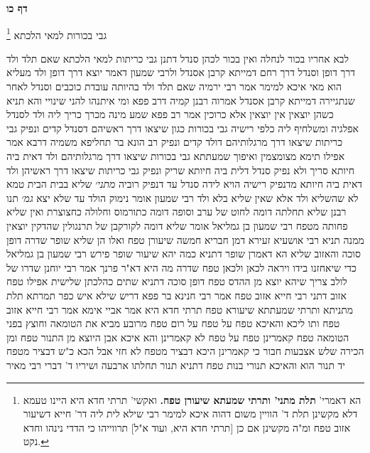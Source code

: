 \documentclass[12pt, openany]{book}
\newcommand{\sethebfont}{
\fontsize{10.5pt}{21.0pt} \selectfont
}
\newcommand{\twocol}[1]{
	{\sethebfont \begin{multicols}{2}
			#1
	\end{multicols}}	
}
\newcommand{\sectname}{}
\newcommand{\newsection}[1]{
	\addcontentsline{toc}{section}{#1}
	\renewcommand{\sectname}{#1}	
	\vspace{-\baselineskip}
	\begin{center}
		\textbf{%
\fontsize{16pt}{16pt}\selectfont
			#1}
	\end{center}
	\vspace{-\baselineskip}
	\nopagebreak
}
\newcommand{\footnotecomment}[1]{\footnote{#1}}
\newcommand{\commenta}[1]{\footnotecomment{#1}}
\begin{document}
\newsection{דף כו}
\twocol{גבי בכורות למאי הלכתא 
\commenta{ הא דאמרי' \textbf{תלת מתני' ותרתי שמעתא שיעורן טפח.}  ואקשי' תרתי חדא היא היינו טעמא דלא מקשינן תלת ד' הוויין משום דהוה איכא למימר רבי שילא לית ליה דר' חייא דשיעור אזוב טפח ומ"ה מקשינן אם כן [תרתי חדא היא, ועוד א"ל] תרווייהו כי הדדי נינהו וחדא נקט. }

לבא אחריו בכור לנחלה ואין בכור לכהן 
סנדל דתנן גבי כריתות למאי הלכתא 
שאם תלד ולד דרך דופן וסנדל דרך רחם דמייתא קרבן אסנדל 
ולרבי שמעון דאמר יוצא דרך דופן ולד מעליא הוא מאי איכא למימר 
אמר רבי ירמיה  שאם תלד ולד בהיותה עובדת כוכבים וסנדל לאחר שנתגיירה דמייתא קרבן אסנדל 
אמרוה רבנן קמיה דרב פפא  ומי איתנהו להני שינויי  והא תניא  כשהן יוצאין אין יוצאין אלא כרוכין 
אמר רב פפא  שמע מינה מכרך כריך ליה ולד לסנדל אפלגיה ומשלחיף ליה כלפי רישיה גבי בכורות כגון שיצאו דרך ראשיהם דסנדל קדים ונפיק  גבי כריתות שיצאו דרך מרגלותיהם דולד קדים ונפיק 
רב הונא בר תחליפא משמיה דרבא אמר  אפילו תימא מצומצמין ואיפוך שמעתתא גבי בכורות שיצאו דרך מרגלותיהם ולד דאית ביה חיותא סריך ולא נפיק סנדל דלית ביה חיותא שריק ונפיק  גבי כריתות שיצאו דרך ראשיהן ולד דאית ביה חיותא מדנפיק רישיה הויא לידה סנדל עד דנפיק רוביה
{\large\emph{מתני׳}} שליא בבית הבית טמא לא שהשליא ולד אלא שאין שליא בלא ולד 
רבי שמעון אומר  נימוק הולד עד שלא יצא
{\large\emph{גמ׳}} תנו רבנן שליא תחלתה דומה לחוט של ערב וסופה דומה כתורמוס וחלולה כחצוצרת ואין שליא פחותה מטפח  רבי שמעון בן גמליאל אומר  שליא דומה לקורקבן של תרנגולין שהדקין יוצאין ממנה 
תניא רבי אושעיא זעירא דמן חבריא  חמשה שיעורן טפח ואלו הן  שליא שופר שדרה דופן סוכה והאזוב 
שליא הא דאמרן  שופר דתניא כמה יהא שיעור שופר  פירש רבי שמעון בן גמליאל  כדי שיאחזנו בידו ויראה לכאן ולכאן טפח 
שדרה מה היא  דא"ר פרנך אמר רבי יוחנן  שדרו של לולב צריך שיהא יוצא מן ההדס טפח  דופן סוכה דתניא  שתים כהלכתן שלישית אפילו טפח  אזוב דתני רבי חייא  אזוב טפח 
אמר רבי חנינא בר פפא דריש שילא איש כפר תמרתא  תלת מתניתא ותרתי שמעתתא שיעורא טפח  תרתי  חדא היא  אמר אביי  אימא אמר רבי חייא אזוב טפח 
ותו ליכא  והאיכא  טפח על טפח על רום טפח מרובע מביא את הטומאה וחוצץ בפני הטומאה 
טפח קאמרינן טפח על טפח לא קאמרינן 
והא איכא  אבן היוצא מן התנור טפח ומן הכירה שלש אצבעות חבור 
כי קאמרינן היכא דבציר מטפח לא חזי אבל הכא כ"ש דבציר מטפח יד תנור הוא 
והאיכא
תנורי בנות טפח דתניא  תנור תחלתו ארבעה ושיריו ד' דברי רבי מאיר 
}
\end{document}
